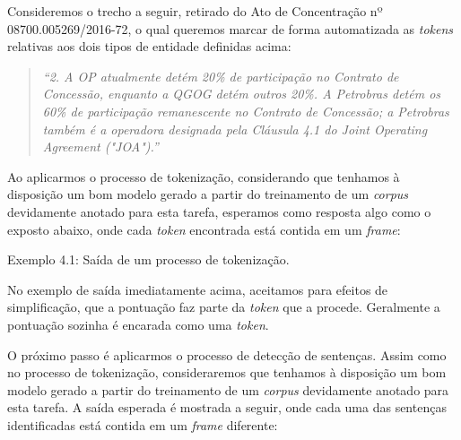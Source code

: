 \documentclass[11pt]{report}
\newcommand{\quotes}[1]{``#1''}
\begin{document}
Consideremos o trecho a seguir, retirado do Ato de Concentração nº 08700.005269/2016-72, o qual queremos marcar de forma automatizada as \textit{tokens} relativas
aos dois tipos de entidade definidas acima:

\begin{quote}
  \textit{\quotes{2. A OP atualmente detém 20\% de participação no Contrato de Concessão, enquanto a QGOG detém outros 20\%.
  A Petrobras detém os 60\% de participação remanescente no Contrato de Concessão; a Petrobras também é a operadora designada
  pela Cláusula 4.1 do Joint Operating Agreement ("JOA").}}
\end{quote}

Ao aplicarmos o processo de tokenização, considerando que tenhamos à disposição um bom modelo gerado a partir do treinamento de um \textit{corpus} devidamente anotado para esta tarefa,
esperamos como resposta algo como o exposto abaixo, onde cada \textit{token} encontrada está contida em um \textit{frame}:

\begin{quote}
             
       
              
       
         
\end{quote}
\begin{center}
  Exemplo 4.1: Saída de um processo de tokenização.
\end{center}

No exemplo de saída imediatamente acima, aceitamos para efeitos de simplificação, que a pontuação faz parte da \textit{token} que a procede.
Geralmente a pontuação sozinha é encarada como uma \textit{token}.

O próximo passo é aplicarmos o processo de detecção de sentenças. Assim como no processo de tokenização, consideraremos que tenhamos à disposição um bom modelo
gerado a partir do treinamento de um \textit{corpus} devidamente anotado para esta tarefa. A saída esperada é mostrada a seguir, onde cada uma das sentenças identificadas está contida
em um \textit{frame} diferente:
\end{document}

